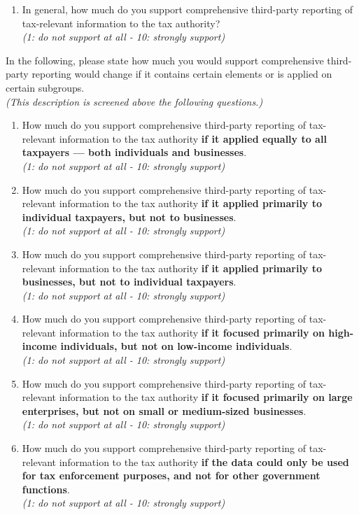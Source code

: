 \documentclass[11pt]{article}
\begin{document}
\begin{enumerate}[resume]
    \item In general, how much do you support comprehensive third-party reporting of tax-relevant information to the tax authority?  \\ \textit{(1: do not support at all - 10: strongly support)}
\end{enumerate}
In the following, please state how much you would support comprehensive third-party reporting would change if it contains certain elements or is applied on certain subgroups.  \\ \textit{(This description is screened above the following questions.)} 
\begin{enumerate}[resume]
    \item How much do you support comprehensive third-party reporting of tax-relevant information to the tax authority \textbf{if it applied equally to all taxpayers — both individuals and businesses}.\\
    \textit{(1: do not support at all - 10: strongly support)}
    \item How much do you support comprehensive third-party reporting of tax-relevant information to the tax authority \textbf{if it applied primarily to individual taxpayers, but not to businesses}.\\
    \textit{(1: do not support at all - 10: strongly support)}
    \item How much do you support comprehensive third-party reporting of tax-relevant information to the tax authority \textbf{if it applied primarily to businesses, but not to individual taxpayers}.\\
    \textit{(1: do not support at all - 10: strongly support)}
    \item How much do you support comprehensive third-party reporting of tax-relevant information to the tax authority \textbf{if it focused primarily on high-income individuals, but not on low-income individuals}.\\
    \textit{(1: do not support at all - 10: strongly support)}
    \item How much do you support comprehensive third-party reporting of tax-relevant information to the tax authority \textbf{if it focused primarily on large enterprises, but not on small or medium-sized businesses}.\\
    \textit{(1: do not support at all - 10: strongly support)}
    \item How much do you support comprehensive third-party reporting of tax-relevant information to the tax authority \textbf{if the data could only be used for tax enforcement purposes, and not for other government functions}.\\
    \textit{(1: do not support at all - 10: strongly support)}
\end{enumerate}
\end{document}

